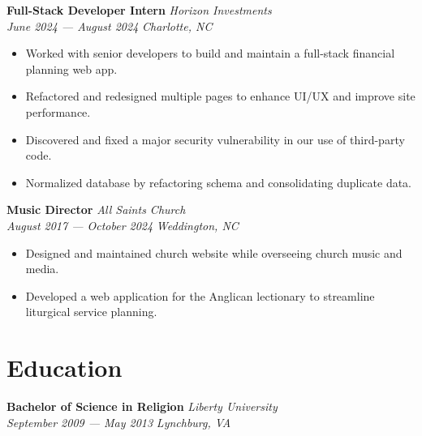 \documentclass[letterpaper, 11pt]{article}
\begin{document}
\noindent
\textbf{Full-Stack Developer Intern}
\hfill \textit{Horizon Investments} \\
\textit{June 2024 — August 2024}
\hfill \textit{Charlotte, NC}
\begin{itemize}
    \item Worked with senior developers to build and maintain a full-stack
        financial planning web app.
    \item Refactored and redesigned multiple pages to enhance UI/UX and improve
        site performance.
    \item Discovered and fixed a major security vulnerability in our use of
        third-party code.
    \item Normalized database by refactoring schema and consolidating duplicate
        data.
\end{itemize}

\noindent
\textbf{Music Director}
\hfill \textit{All Saints Church} \\
\textit{August 2017 — October 2024}
\hfill \textit{Weddington, NC}
\begin{itemize}
    \item Designed and maintained church website while overseeing church music
        and media.
    \item Developed a web application for the Anglican lectionary to streamline
        liturgical service planning.
\end{itemize}


\section*{Education}
\textbf{Bachelor of Science in Religion}
\hfill \textit{Liberty University} \\
\textit{September 2009 — May 2013}
\hfill \textit{Lynchburg, VA}
\end{document}
